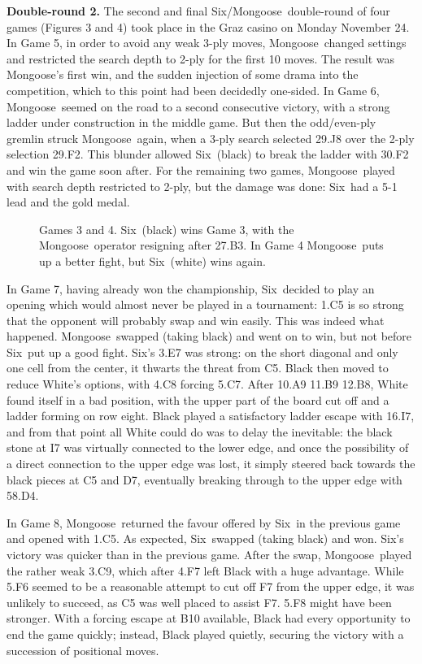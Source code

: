 \documentclass[12pt]{article}
\def\Six{{\sc Six}}
\def\Mg{{\sc Mongoose}}
\begin{document}
{\noindent\large\bf Double-round 2.}
The second and final \Six/\Mg\ double-round of four games (Figures 3 and 4)
took place in the Graz casino on Monday November 24.
In Game 5, in order to avoid any weak 3-ply moves,
\Mg\ changed settings and restricted the search depth to 2-ply for the first 10 moves.
The result was \Mg's first win,
and the sudden injection of some drama into the  competition,
which to this point had been decidedly one-sided.
In Game 6, \Mg\ seemed on the road to a second consecutive victory,
with a strong ladder under construction in the middle game.
But then the odd/even-ply gremlin struck \Mg\ again,
when a 3-ply search selected 29.J8 over the 2-ply selection 29.F2.
This blunder allowed \Six\ (black) to break the ladder with 30.F2
and win the game soon after.
For the remaining two games, \Mg\ played with search
depth restricted to 2-ply,
but the damage was done: \Six\ had a 5-1 lead and the gold medal.

\begin{figure}\label{fig2}
\hspace*{-.2in}
\caption{Games 3 and 4.
\Six\ (black) wins Game 3, with the \Mg\ operator resigning after 27.B3.
In Game 4 \Mg\ puts up a better fight, but \Six\ (white) wins again.}
\end{figure}

In Game 7,
having already won the championship, \Six\ decided to play an opening
which would almost never be played in a tournament: 1.C5 is so strong
that the opponent will probably swap and win easily.
This was indeed what happened. \Mg\ swapped (taking black) and went
on to win, but not before \Six\ put up a good fight.
\Six's 3.E7 was strong: on the short diagonal
and only one cell from the center, it thwarts the threat from C5.
Black then moved to reduce White's options, with 4.C8 forcing 5.C7.
After 10.A9 11.B9 12.B8, White found itself in a bad position,
with the upper part of the board cut off and 
a ladder forming on row eight. 
Black played a satisfactory ladder escape with 16.I7,
and from that point all White could do was to delay the inevitable:
the black stone at I7 was virtually connected to the lower edge,
and once the possibility of a direct connection to the upper edge was lost,
it simply steered back towards the black pieces at C5 and D7,
eventually breaking through to the upper edge with 58.D4.

In Game 8, \Mg\ returned the favour offered by \Six\
in the previous game and opened with 1.C5. 
As expected, \Six\ swapped (taking black) and won.
\Six's victory was quicker than in the previous game.
After the swap, \Mg\ played the rather weak 3.C9,
which after 4.F7 left Black with a huge advantage. 
While 5.F6 seemed to be a reasonable attempt to cut off F7 from the upper edge,
it was unlikely to succeed, as C5 was well placed to assist F7.
5.F8 might have been stronger. 
With a forcing escape at B10 available, 
Black had every opportunity to end the game quickly;
instead, Black played quietly,
securing the victory with a succession of positional moves.
\end{document}
